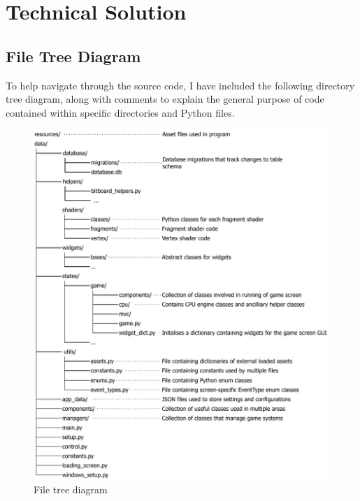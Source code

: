 \documentclass[../main/main.tex]{subfiles}
\begin{document}
\newpage

\chapter{Technical Solution}
\localtableofcontents

\section{File Tree Diagram}
To help navigate through the source code, I have included the following directory tree diagram, along with comments to explain the general purpose of code contained within specific directories and Python files.

\begin{figure}[H]
    \centering
    \includegraphics[width=0.9\columnwidth]{../technical_solution/assets/file_tree_diagram.pdf}
    \caption{File tree diagram}
    \label{fig:file-tree-diagram}
\end{figure}
\end{document}
